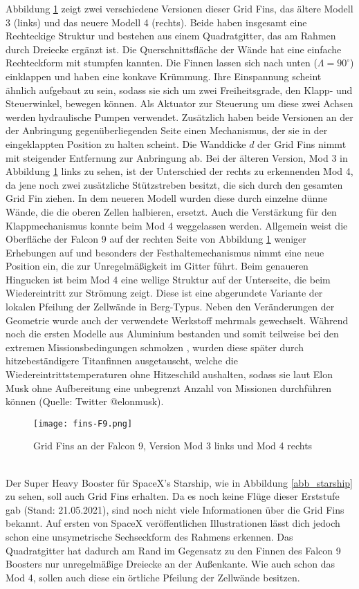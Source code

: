 Abbildung \ref{abb_finsF9} zeigt zwei verschiedene Versionen dieser Grid Fins, das ältere Modell 3 (links) und das neuere Modell 4 (rechts). Beide haben insgesamt eine Rechteckige Struktur und bestehen aus einem Quadratgitter, das am Rahmen durch Dreiecke ergänzt ist. Die Querschnittsfläche der Wände hat eine einfache Rechteckform mit stumpfen kannten. Die Finnen lassen sich nach unten ($\Lambda = 90^\circ$) einklappen und haben eine konkave Krümmung. Ihre Einspannung scheint ähnlich aufgebaut zu sein, sodass sie sich um zwei Freiheitsgrade, den Klapp- und Steuerwinkel, bewegen können. Als Aktuator zur Steuerung um diese zwei Achsen werden hydraulische Pumpen verwendet. Zusätzlich haben beide Versionen an der der Anbringung gegenüberliegenden Seite einen Mechanismus, der sie in der eingeklappten Position zu halten scheint. Die Wanddicke $d$ der Grid Fins nimmt mit steigender Entfernung zur Anbringung ab. Bei der älteren Version, Mod 3 in Abbildung \ref{abb_finsF9} links zu sehen, ist der Unterschied der rechts zu erkennenden Mod 4, da jene noch zwei zusätzliche Stützstreben besitzt, die sich durch den gesamten Grid Fin ziehen. In dem neueren Modell wurden diese durch einzelne dünne Wände, die die oberen Zellen halbieren, ersetzt. Auch die Verstärkung für den Klappmechanismus konnte beim Mod 4 weggelassen werden. Allgemein weist die Oberfläche der Falcon 9 auf der rechten Seite von Abbildung \ref{abb_finsF9} weniger Erhebungen auf und besonders der Festhaltemechanismus nimmt eine neue Position ein, die zur Unregelmäßigkeit im Gitter führt. Beim genaueren Hingucken ist beim Mod 4 eine wellige Struktur auf der Unterseite, die beim Wiedereintritt zur Strömung zeigt. Diese ist eine abgerundete Variante der lokalen Pfeilung der Zellwände in Berg-Typus. Neben den Veränderungen der Geometrie wurde auch der verwendete Werkstoff mehrmals gewechselt. Während noch die ersten Modelle aus Aluminium bestanden und somit teilweise bei den extremen Missionsbedingungen schmolzen \cite{titanium}, wurden diese später durch hitzebeständigere Titanfinnen ausgetauscht, welche die Wiedereintrittstemperaturen ohne Hitzeschild aushalten, sodass sie laut Elon Musk ohne Aufbereitung eine unbegrenzt Anzahl von Missionen durchführen können (Quelle: Twitter @elonmusk).
\begin{figure}[h]
	\centering
	\texttt{[image: fins-F9.png]}
	\caption{Grid Fins an der Falcon 9, Version Mod 3 links und Mod 4 rechts}
	\label{abb_finsF9}
\end{figure}\\
Der Super Heavy Booster für SpaceX's Starship, wie in Abbildung \ref{abb_starship} zu sehen, soll auch Grid Fins erhalten. Da es noch keine Flüge dieser Erststufe gab (Stand: 21.05.2021), sind noch nicht viele Informationen über die Grid Fins bekannt. Auf ersten von SpaceX veröffentlichen Illustrationen lässt dich jedoch schon eine unsymetrische Sechseckform des Rahmens erkennen. Das Quadratgitter hat dadurch am Rand im Gegensatz zu den Finnen des Falcon 9 Boosters nur unregelmäßige Dreiecke an der Außenkante. Wie auch schon das Mod 4, sollen auch diese ein örtliche Pfeilung der Zellwände besitzen.

